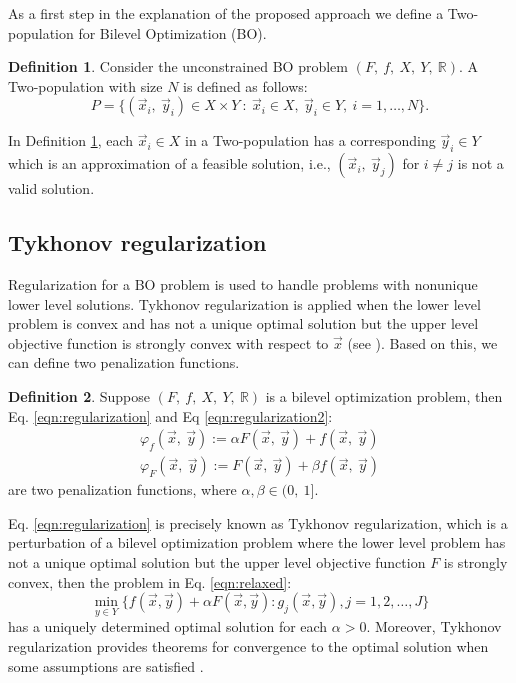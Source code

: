 \documentclass[conference]{IEEEtran}
\theoremstyle{definition}
\newtheorem{definition}{Definition}[section]
\begin{document}
As a first step in the explanation of the proposed approach we define a
Two-population for Bilevel Optimization (BO).

\begin{definition}
    \label{def:pop2}
    Consider the unconstrained BO problem $(F, \ f, \ X, \ Y, \ \mathbb{R} )$. A
    Two-population with size $N$ is defined as follows:
    $$
        P = \{  (\vec{x}_i, \ \vec{y}_i) \in X \times Y \ : \
                \vec{x}_i \in X, \ \vec{y}_i \in Y, \ i=1,\ldots,N
            \}.
    $$     
\end{definition}
 
In Definition \ref{def:pop2}, each $\vec{x}_i \in X$ in a Two-population has a
corresponding $\vec{y}_i \in Y$ which is an approximation of a feasible solution,
i.e., $(\vec{x}_i, \ \vec{y}_j)$ for $i \neq j$ is  not a valid solution.

\subsection{Tykhonov regularization}
Regularization for a BO problem is used to handle problems with nonunique lower
level solutions.  Tykhonov regularization is applied when the lower level problem
is convex and has not a unique optimal solution but the upper level objective function
is strongly convex with respect to $\vec{x}$ (see \cite{dempe2002foundations}).
Based on this, we can define two penalization functions.

\begin{definition}
    Suppose $(F, \ f, \ X, \ Y, \ \mathbb{R} )$ is a bilevel optimization problem,
    then Eq. \ref{eqn:regularization} and Eq \ref{eqn:regularization2}:
    \begin{align}
        \label{eqn:regularization}
        \varphi_f (\vec{x},\ \vec{y}) := \alpha F(\vec{x},\ \vec{y}) +  f(\vec{x},\ \vec{y}) \\
        \label{eqn:regularization2}
        \varphi_F (\vec{x},\ \vec{y}) := F(\vec{x},\ \vec{y}) +  \beta f(\vec{x},\ \vec{y})
    \end{align}
    are two penalization functions, where $\alpha, \beta \in (0,\ 1]$.
\end{definition}
% 
Eq. \ref{eqn:regularization} is precisely known as Tykhonov regularization, which is a
perturbation of a bilevel optimization problem where the lower level problem has
not a unique optimal solution but the upper level objective function $F$ is 
strongly convex, then the problem in Eq. \ref{eqn:relaxed}:
\begin{equation}
    \min_{y \in Y} \{ f(\vec{x},\vec{y}) + \alpha F(\vec{x}, \vec{y}) : g_j(\vec{x}, \vec{y}), j=1,2,\ldots, J\} 
    \label{eqn:relaxed}
\end{equation}
% 
has a uniquely determined optimal solution for each $\alpha > 0$. 
Moreover, Tykhonov regularization provides theorems for convergence to the optimal
solution when some assumptions are satisfied \cite{dempe2002foundations}. 
\end{document}
